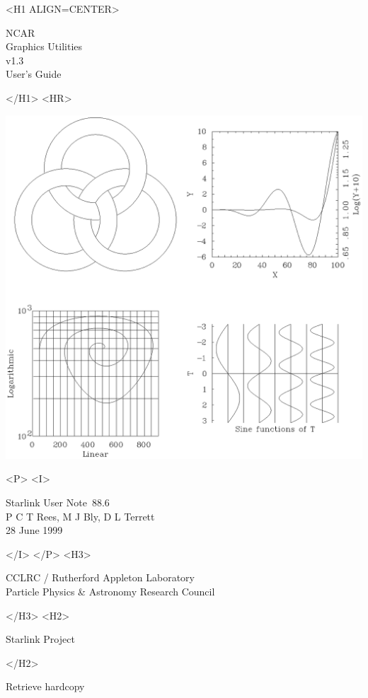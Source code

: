 \documentclass[twoside,11pt]{article}
\newcommand{\stardoccategory}  {Starlink User Note}
\newcommand{\stardocsource}    {sun\stardocnumber}
\newcommand{\stardocnumber}    {88.6}
\newcommand{\stardocauthors}   {P C T Rees, M J Bly, D L Terrett}
\newcommand{\stardocdate}      {28 June 1999}
\newcommand{\stardoctitle}     {NCAR \\ [1ex] Graphics Utilities}
\newcommand{\stardocversion}   {v1.3}
\newcommand{\stardocmanual}    {User's Guide}
\newcommand{\htmladdnormallink}[2]{#1}
\newcommand{\htmladdimg}[1]{}
\newcommand{\xlabel}[1]{}
\renewcommand{\_}{\texttt{\symbol{95}}}
\begin{document}
\begin{htmlonly}
   \xlabel{}
   \begin{rawhtml} <H1 ALIGN=CENTER> \end{rawhtml}
      \stardoctitle\\
      \stardocversion\\
      \stardocmanual
   \begin{rawhtml} </H1> <HR> \end{rawhtml}

\includegraphics[viewport=0 360 450 800,scale=0.8,clip]{sun88_cover.eps}

   \begin{rawhtml} <P> <I> \end{rawhtml}
   \stardoccategory\ \stardocnumber \\
   \stardocauthors \\
   \stardocdate
   \begin{rawhtml} </I> </P> <H3> \end{rawhtml}
      \htmladdnormallink{CCLRC}{http://www.cclrc.ac.uk} /
      \htmladdnormallink{Rutherford Appleton Laboratory}
                        {http://www.cclrc.ac.uk/ral} \\
      \htmladdnormallink{Particle Physics \& Astronomy Research Council}
                        {http://www.pparc.ac.uk} \\
   \begin{rawhtml} </H3> <H2> \end{rawhtml}
      \htmladdnormallink{Starlink Project}{http://www.starlink.rl.ac.uk/}
   \begin{rawhtml} </H2> \end{rawhtml}
   \htmladdnormallink{\htmladdimg{source.gif} Retrieve hardcopy}
      {http://www.starlink.rl.ac.uk/cgi-bin/hcserver?\stardocsource}\\


\end{htmlonly}
\end{document}
